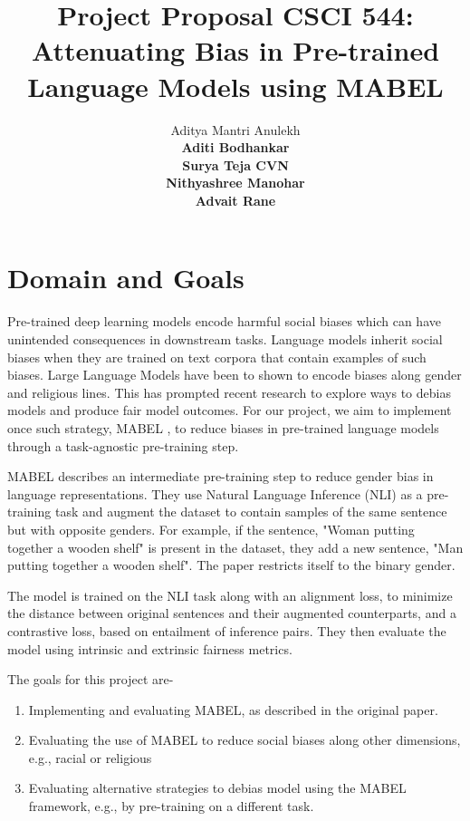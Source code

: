 \documentclass[11pt]{article}
\title{Project Proposal CSCI 544: Attenuating Bias in Pre-trained Language Models using MABEL}
\author{Aditya Mantri Anulekh \\ {\bf Aditi Bodhankar} \\ {\bf Surya Teja CVN} \\ {\bf Nithyashree Manohar} \\ {\bf Advait Rane}}
\begin{document}
\maketitle

\section{Domain and Goals}
Pre-trained deep learning models encode harmful social biases which can have unintended consequences in downstream tasks. Language models inherit social biases when they are trained on text corpora that contain examples of such biases. Large Language Models have been to shown to encode biases along gender and religious lines. This has prompted recent research to explore ways to debias models and produce fair model outcomes. For our project, we aim to implement once such strategy, MABEL \cite{he2022mabel}, to reduce biases in pre-trained language models through a task-agnostic pre-training step.

MABEL describes an intermediate pre-training step to reduce gender bias in language representations. They use Natural Language Inference (NLI) as a pre-training task and augment the dataset to contain samples of the same sentence but with opposite genders. For example, if the sentence, "Woman putting together a wooden shelf" is present in the dataset, they add a new sentence, "Man putting together a wooden shelf". The paper restricts itself to the binary gender. 

The model is trained on the NLI task along with an alignment loss, to minimize the distance between original sentences and their augmented counterparts, and a contrastive loss, based on entailment of inference pairs. They then evaluate the model using intrinsic and extrinsic fairness metrics.

The goals for this project are-
\begin{enumerate}
    \item Implementing and evaluating MABEL, as described in the original paper.
    \item Evaluating the use of MABEL to reduce social biases along other dimensions, e.g., racial or religious
    \item Evaluating alternative strategies to debias model using the MABEL framework, e.g., by pre-training on a different task.
\end{enumerate}
\end{document}
